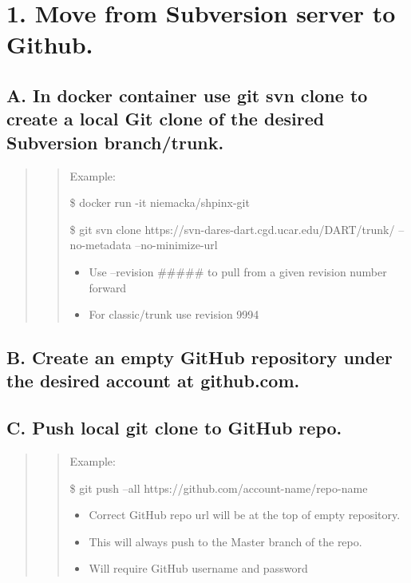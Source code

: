 \documentclass[letterpaper,10pt,english]{sphinxmanual}
\begin{document}
\section{1. Move from Subversion server to Github.}
\label{docs/Process:move-from-subversion-server-to-github}

\subsection{A. In docker container use git svn clone to create a local Git clone of the desired   Subversion branch/trunk.}
\label{docs/Process:a-in-docker-container-use-git-svn-clone-to-create-a-local-git-clone-of-the-desired-subversion-branch-trunk}\begin{quote}
\begin{quote}

Example:

\$ docker run -it niemacka/shpinx-git

\$ git svn clone https://svn-dares-dart.cgd.ucar.edu/DART/trunk/ --no-metadata  --no-minimize-url
\begin{itemize}
\item {} 
Use --revision \#\#\#\#\# to pull from a given revision number forward

\item {} 
For classic/trunk use revision 9994

\end{itemize}
\end{quote}
\end{quote}


\subsection{B. Create an empty GitHub repository under the desired account at github.com.}
\label{docs/Process:b-create-an-empty-github-repository-under-the-desired-account-at-github-com}

\subsection{C. Push local git clone to GitHub repo.}
\label{docs/Process:c-push-local-git-clone-to-github-repo}\begin{quote}
\begin{quote}

Example:

\$ git push --all https://github.com/account-name/repo-name
\begin{itemize}
\item {} 
Correct GitHub repo url will be at the top of empty repository.

\item {} 
This will always push to the Master branch of the repo.

\item {} 
Will require GitHub username and password

\end{itemize}
\end{quote}
\end{quote}
\end{document}
